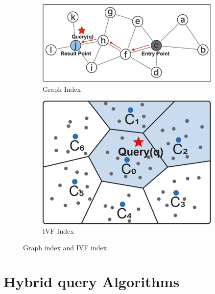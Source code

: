 \documentclass[sigconf, nonacm]{acmart}
\begin{document}
	\begin{figure}
		\begin{subfigure}{0.60\columnwidth}
			\centering
			
			\includegraphics[width=\linewidth]{figures/graph.pdf}
			\caption{Graph Index}
			\label{fig:graph}
		\end{subfigure}
		\hfill
		\begin{subfigure}{0.38\columnwidth}
			\centering
			
			\includegraphics[width=\linewidth]{figures/ivf.pdf}
			\caption{IVF Index}
			\label{fig:ivf}
		\end{subfigure}
		
		
		\caption{Graph index and IVF index}
		
	\end{figure}
	
	
	\section{Hybrid query Algorithms}
	
\end{document}
